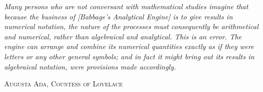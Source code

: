 \documentclass[9pt,a4paper,twoside]{thesis}
\let\origepigraph\epigraph
\renewcommand\epigraph[2]{\origepigraph{\textit{#1}}{\textsc{#2}}}
\begin{document}
\pagestyle{fancy}  \mainmatter
\epigraph{
Many persons who are not conversant with mathematical studies imagine that
because the business of [Babbage's Analytical Engine] is to give results in
numerical notation, the nature of the processes must consequently be
arithmetical and numerical, rather than algebraical and analytical. This is an
error. The engine can arrange and combine its numerical quantities exactly as if
they were letters or any other general symbols; and in fact it might bring out
its results in algebraical notation, were provisions made accordingly.}
{Augusta Ada, Countess of Lovelace}
%
%
%
%
%
%
%
%
%
%
\backmatter

\end{document}
